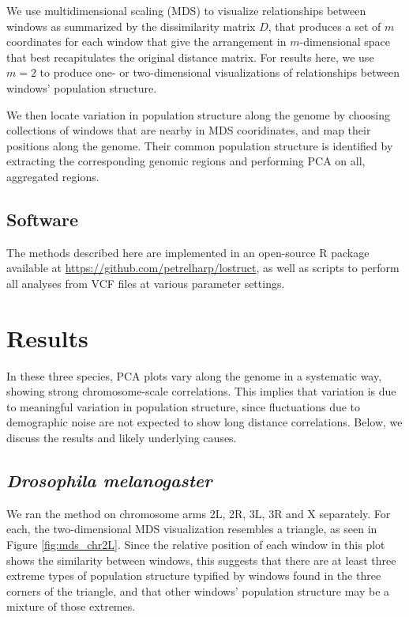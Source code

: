 \documentclass[11pt, oneside]{article}   	%
\begin{document}
We use multidimensional scaling (MDS) to visualize relationships between windows
as summarized by the dissimilarity matrix $D$,
that produces a set of $m$ coordinates for each window that
give the arrangement in $m$-dimensional space that best recapitulates the original distance matrix.
For results here, we use $m=2$ to produce one- or two-dimensional visualizations of relationships between windows' population structure.

We then locate variation in population structure along the genome
by choosing collections of windows that are nearby in MDS cooridinates,
and map their positions along the genome.
Their common population structure is identified by extracting the corresponding genomic regions
and performing PCA on all, aggregated regions.


\subsection{Software}

The methods described here
are implemented in an open-source R package
available at \url{https://github.com/petrelharp/lostruct},
as well as scripts to perform all analyses from VCF files
at various parameter settings.


\section{Results}

In these three species, PCA plots vary along the genome in a systematic way, showing strong chromosome-scale correlations.
This implies that variation is due to meaningful variation in population structure, 
since fluctuations due to demographic noise are not expected to show long distance correlations. 
Below, we discuss the results and likely underlying causes.


\subsection{\textit{Drosophila melanogaster}}

We ran the method on chromosome arms 2L, 2R, 3L, 3R and X separately. 
For each, the two-dimensional MDS visualization resembles a triangle,
as seen in Figure \ref{fig:mds_chr2L}.
Since the relative position of each window in this plot shows the similarity between windows, 
this suggests that there are at least three extreme types of population structure 
typified by windows found in the three corners of the triangle,
and that other windows' population structure may be a mixture of those extremes. 
\end{document}
